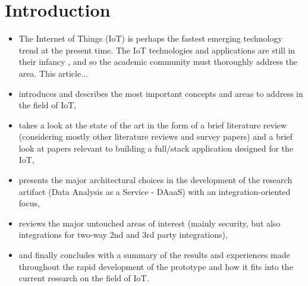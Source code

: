 \section{Introduction}

\begin{itemize}
    \item The Internet of Things (IoT) is perhaps the fastest emerging technology trend at the present time. The IoT technologies and applications are still in their infancy \autocite{xu-he-li:internet-of-things-in-industries-a-survery:2014}, and so the academic community must thoroughly address the area. This article...
    \item introduces and describes the most important concepts and areas to address in the field of IoT,
    \item takes a look at the state of the art in the form of a brief literature review (considering mostly other literature reviews and survey papers) and a brief look at papers relevant to building a full/stack application designed for the IoT,
    \item presents the major architectural choices in the development of the research artifact (Data Analysis as a Service - DAaaS) with an integration-oriented focus,
    \item reviews the major untouched areas of interest (mainly security, but also integrations for two-way 2nd and 3rd party integrations),
    \item and finally concludes with a summary of the results and experiences made throughout the rapid development of the prototype and how it fits into the current research on the field of IoT.
\end{itemize}
